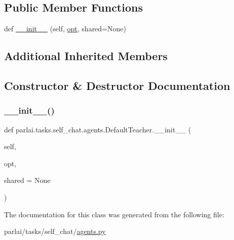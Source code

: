 \subsection*{Public Member Functions}
\begin{DoxyCompactItemize}
\item 
def \hyperlink{classparlai_1_1tasks_1_1self__chat_1_1agents_1_1DefaultTeacher_a29cf7f383ed619d7c2145ab22a740008}{\+\_\+\+\_\+init\+\_\+\+\_\+} (self, \hyperlink{classparlai_1_1core_1_1agents_1_1Teacher_a3ce6243860ce978a897922863ed32fa4}{opt}, shared=None)
\end{DoxyCompactItemize}
\subsection*{Additional Inherited Members}


\subsection{Constructor \& Destructor Documentation}
\mbox{\label{classparlai_1_1tasks_1_1self__chat_1_1agents_1_1DefaultTeacher_a29cf7f383ed619d7c2145ab22a740008}} 
\subsubsection{\texorpdfstring{\+\_\+\+\_\+init\+\_\+\+\_\+()}{\_\_init\_\_()}}
{\footnotesize\ttfamily def parlai.\+tasks.\+self\+\_\+chat.\+agents.\+Default\+Teacher.\+\_\+\+\_\+init\+\_\+\+\_\+ (\begin{DoxyParamCaption}\item[{}]{self,  }\item[{}]{opt,  }\item[{}]{shared = {\ttfamily None} }\end{DoxyParamCaption})}



The documentation for this class was generated from the following file\+:\begin{DoxyCompactItemize}
\item 
parlai/tasks/self\+\_\+chat/\hyperlink{parlai_2tasks_2self__chat_2agents_8py}{agents.\+py}\end{DoxyCompactItemize}
